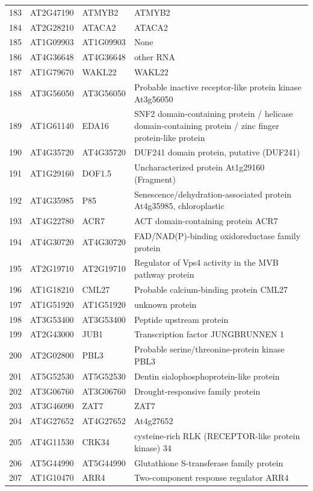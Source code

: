 \documentclass[11pt]{article}
\begin{document}
\begin{center}
\begin{tabular}{rlll}
183 & AT2G47190 & ATMYB2 & ATMYB2\\
184 & AT2G28210 & ATACA2 & ATACA2\\
185 & AT1G09903 & AT1G09903 & None\\
186 & AT4G36648 & AT4G36648 & other RNA\\
187 & AT1G79670 & WAKL22 & WAKL22\\
188 & AT3G56050 & AT3G56050 & Probable inactive receptor-like protein kinase At3g56050\\
189 & AT1G61140 & EDA16 & SNF2 domain-containing protein / helicase domain-containing protein / zinc finger protein-like protein\\
190 & AT4G35720 & AT4G35720 & DUF241 domain protein, putative (DUF241)\\
191 & AT1G29160 & DOF1.5 & Uncharacterized protein At1g29160 (Fragment)\\
192 & AT4G35985 & P85 & Senescence/dehydration-associated protein At4g35985, chloroplastic\\
193 & AT4G22780 & ACR7 & ACT domain-containing protein ACR7\\
194 & AT4G30720 & AT4G30720 & FAD/NAD(P)-binding oxidoreductase family protein\\
195 & AT2G19710 & AT2G19710 & Regulator of Vps4 activity in the MVB pathway protein\\
196 & AT1G18210 & CML27 & Probable calcium-binding protein CML27\\
197 & AT1G51920 & AT1G51920 & unknown protein\\
198 & AT3G53400 & AT3G53400 & Peptide upstream protein\\
199 & AT2G43000 & JUB1 & Transcription factor JUNGBRUNNEN 1\\
200 & AT2G02800 & PBL3 & Probable serine/threonine-protein kinase PBL3\\
201 & AT5G52530 & AT5G52530 & Dentin sialophosphoprotein-like protein\\
202 & AT3G06760 & AT3G06760 & Drought-responsive family protein\\
203 & AT3G46090 & ZAT7 & ZAT7\\
204 & AT4G27652 & AT4G27652 & At4g27652\\
205 & AT4G11530 & CRK34 & cysteine-rich RLK (RECEPTOR-like protein kinase) 34\\
206 & AT5G44990 & AT5G44990 & Glutathione S-transferase family protein\\
207 & AT1G10470 & ARR4 & Two-component response regulator ARR4\\

\end{tabular}
\end{center}
\end{document}

